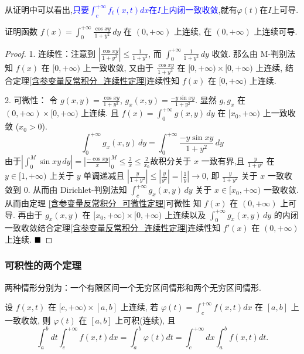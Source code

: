 \documentclass[lang=cn,newtx,10pt,scheme=chinese]{elegantbook}
\begin{document}
\begin{remark}
    从证明中可以看出,\textcolor{blue}{只要$\int_c^{+\infty} f_t(x,t)dx$在$I$上内闭一致收敛},就有$\varphi(t)$在$I$上可导.
\end{remark}

\begin{example}
证明函数 $f(x) = \int_{0}^{+\infty} \frac{\cos xy}{1+y^2} \,dy$ 在 $(0, +\infty)$ 上连续, 在 $(0, +\infty)$ 上连续可导.
\end{example}

\begin{proof}
1. 连续性：注意到 $|\frac{\cos xy}{1+y^2}| \le \frac{1}{1+y^2}$, 而 $\int_0^{+\infty} \frac{1}{1+y^2} \,dy$ 收敛.
那么由 M-判别法知 $f(x)$ 在 $[0, +\infty)$ 上一致收敛, 又由于 $\frac{\cos xy}{1+y^2}$ 在 $[0, +\infty) \times [0, +\infty)$ 上连续, 结合定理\ref{含参变量反常积分_连续性定理}连续性知 $f(x)$ 在 $[0, +\infty)$ 上连续.

2. 可微性：
令 $g(x,y) = \frac{\cos xy}{1+y^2}$, $g_x(x,y) = \frac{-y\sin xy}{1+y^2}$. 显然 $g, g_x$ 在 $(0, +\infty) \times [0, +\infty)$ 上连续.
且 $f(x) = \int_0^{+\infty} g(x,y) \,dy$ 在 $[x_0, +\infty)$ 上一致收敛 ($x_0>0$).
$$
\int_0^{+\infty} g_x(x,y) \,dy = \int_0^{+\infty} \frac{-y\sin xy}{1+y^2} \,dy
$$
由于$ \left|\int_0^M \sin xy \,dy\right| = \left|\frac{-\cos xy}{x}\right|_0^M \le \frac{2}{x} \le \frac{2}{x_0}$故积分关于 $x$ 一致有界,且 $\frac{y}{1+y^2}$ 在 $y \in [1, +\infty)$ 上关于 $y$ 单调递减且
$|\frac{y}{1+y^2}| \le |\frac{y}{y^2}| = |\frac{1}{y}| \to 0$, 即 $\frac{y}{1+y^2}$ 关于 $x$ 一致收敛到 $0$. 从而由 Dirichlet-判别法知
$\int_c^{+\infty} g_x(x,y) \,dy$ 关于 $x \in [x_0, +\infty)$ 一致收敛. 从而由定理 \ref{含参变量反常积分_可微性定理}可微性 知 $f(x)$ 在 $(0, +\infty)$ 上可导.
再由于 $g_x(x,y)$ 在 $[x_0, +\infty) \times [0, +\infty)$ 上连续以及 $\int_0^{+\infty} g_x(x,y) \,dy$ 的内闭一致收敛结合定理\ref{含参变量反常积分_连续性定理}连续性知 $f'(x)$ 在 $(0, +\infty)$ 上连续.
$\hfill \blacksquare$
\end{proof}

\subsubsection{可积性的两个定理}
两种情形分别为：一个有限区间一个无穷区间情形和两个无穷区间情形.

\begin{theorem}\label{含参变量反常积分_可积性定理(一个有限区间)}
设 $f(x, t)$ 在 $[c, +\infty) \times [a, b]$ 上连续, 若 $\varphi(t) = \int_{c}^{+\infty} f(x, t) dx$ 在 $[a, b]$ 上一致收敛, 则 $\varphi(t)$ 在 $[a, b]$ 上可积(连续), 且
$$ \int_{a}^{b} dt \int_{c}^{+\infty} f(x, t) dx = \int_{a}^{b} \varphi(t) dt = \int_{c}^{+\infty} dx \int_{a}^{b} f(x, t) dt. $$
\end{theorem}
\end{document}
